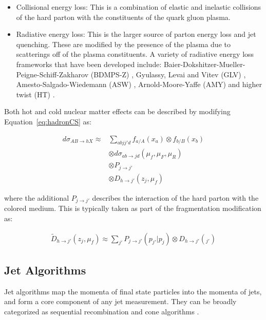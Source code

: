 \begin{itemize}
\item Collisional energy loss: This is a combination of elastic and inelastic collisions of the hard parton with the constituents of the quark gluon plasma.

\item Radiative energy loss: This is the larger source of parton energy loss and jet quenching.
These are modified by the presence of the plasma due to scatterings off of the plasma constituents.
A variety of radiative energy loss frameworks that have been developed include: Baier-Dokshitzer-Mueller-Peigne-Schiff-Zakharov (BDMPS-Z) \cite{BAIER1997291}, Gyulassy, Levai and Vitev (GLV) \cite{Gyulassy:1999zd}, Amesto-Salgado-Wiedemann (ASW) \cite{Wiedemann:2000za},  Arnold-Moore-Yaffe (AMY) \cite{Arnold:2001ba} and higher twist (HT) \cite{Guo:2000nz}.
\end{itemize}

Both hot and cold nuclear matter effects can be described by modifying Equation~\ref{eq:hadronCS} as:

\begin{align}
d \sigma_{AB \rightarrow hX}  \approx & \sum_{abjj'd} f_{a/A} (x_a) \otimes f_{b/B} (x_b) \\ 
& \otimes d\sigma_{ab\rightarrow jd} (\mu_f, \mu_F, \mu_R)  \nonumber \\
& \otimes P_{j\rightarrow j'} \nonumber \\
& \otimes D_{h \rightarrow j'} (z_j, \mu_f) \nonumber 
\end{align}

where the additional $P_{j\rightarrow j'}$ describes the interaction of the hard parton with the colored medium.
This is typically taken as part of the fragmentation modification as:

\begin{align}
\widetilde{D}_{h \rightarrow j'} (z_j, \mu_f) \approx \sum_{j'} P_{j\rightarrow j'} (p_{j'} | p_j) \otimes D_{h\rightarrow j'} (_{j'})
\end{align}




\subsection{Jet Algorithms}
\label{sec:jet_algo}
Jet algorithms map the momenta of final state particles into the momenta of jets, and form a core component of any jet measurement.
They can be broadly categorized as sequential recombination and cone algorithms \cite{Atkin_2015}. 

